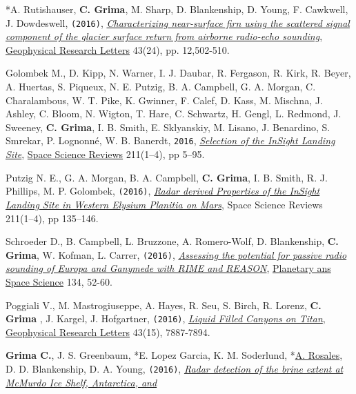 \begin{etaremune}
  *A. Rutishauser, \textbf{C. Grima}, M. Sharp, D.
  Blankenship, D. Young, F. Cawkwell, J. Dowdeswell, \texttt{(2016)},
  \href{http://onlinelibrary.wiley.com/doi/10.1002/2016GL071230/full}{\emph{Characterizing
  near-surface firn using the scattered signal component of the glacier
  surface return from airborne radio-echo sounding}}, \ul{Geophysical
  Research Letters} 43(24), pp. 12,502-510.
\item
  Golombek M., D. Kipp, N. Warner, I. J. Daubar, R. Fergason, R. Kirk,
  R. Beyer, A. Huertas, S. Piqueux, N. E. Putzig, B. A. Campbell, G. A.
  Morgan, C. Charalambous, W. T. Pike, K. Gwinner, F. Calef, D. Kass, M.
  Mischna, J. Ashley, C. Bloom, N. Wigton, T. Hare, C. Schwartz, H.
  Gengl, L. Redmond, J. Sweeney, \textbf{C. Grima}, I. B. Smith, E.
  Sklyanskiy, M. Lisano, J. Benardino, S. Smrekar, P. Lognonné, W. B.
  Banerdt, \texttt{2016},
  \href{http://link.springer.com/article/10.1007/s11214-016-0321-9?wt_mc=Internal.Event.1.SEM.ArticleAuthorOnlineFirst}{\emph{Selection
  of the InSight Landing Site}}, \ul{Space Science Reviews} 211(1–4), pp 5–95.
\item
  Putzig N. E., G. A. Morgan, B. A. Campbell, \textbf{C. Grima}, I. B.
  Smith, R. J. Phillips, M. P. Golombek, \texttt{(2016)},
  \href{http://link.springer.com/article/10.1007\%2Fs11214-016-0322-8}{\emph{Radar
  derived Properties of the InSight Landing Site in Western Elysium
  Planitia on Mars}}, Space Science Reviews 211(1–4), pp 135–146.
\item
  Schroeder D., B. Campbell, L. Bruzzone, A. Romero-Wolf, D.
  Blankenship, \textbf{C. Grima}, W. Kofman, L. Carrer, \texttt{(2016)},
  \href{http://www.sciencedirect.com/science/article/pii/S0032063316301465}{\emph{Assessing
  the potential for passive radio sounding of Europa and Ganymede with
  RIME and REASON}}, \ul{Planetary ans Space Science} 134,  52-60.
\item
  Poggiali V., M. Mastrogiuseppe, A. Hayes, R. Seu, S. Birch, R. Lorenz,
  \textbf{C. Grima }, J. Kargel, J. Hofgartner, \texttt{(2016)},
  \href{http://onlinelibrary.wiley.com/doi/10.1002/2016GL069679/abstract}{\emph{Liquid
  Filled Canyons on Titan}}, \ul{Geophysical Research Letters} 43(15), 7887-7894.
\item
  \textbf{Grima C.}, J. S. Greenbaum, *E. Lopez Garcia, K.
  M. Soderlund, *\ul{A. Rosales}, D. D. Blankenship, D. A. Young,
  \texttt{(2016)},
  \href{http://onlinelibrary.wiley.com/doi/10.1002/2016GL069524/pdf}{\emph{Radar
  detection of the brine extent at McMurdo Ice Shelf, Antarctica, and
}}
\end{etaremune}
